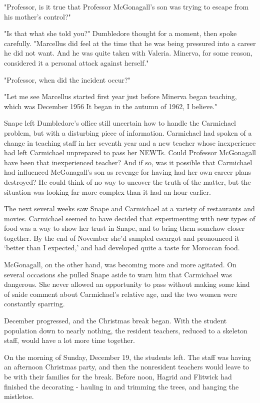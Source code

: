 "Professor, is it true that Professor McGonagall's son was trying to escape from his mother's control?"

"Is that what she told you?" Dumbledore thought for a moment, then spoke carefully. "Marcellus did feel at the time that he was being pressured into a career he did not want. And he was quite taken with Valeria. Minerva, for some reason, considered it a personal attack against herself."

"Professor, when did the{\el} incident{\el} occur?"

"Let me see{\el} Marcellus started first year just before Minerva began teaching, which was December 1956{\el} It began in the autumn of 1962, I believe."

Snape left Dumbledore's office still uncertain how to handle the Carmichael problem, but with a disturbing piece of information. Carmichael had spoken of a change in teaching staff in her seventh year and a new teacher whose inexperience had left Carmichael unprepared to pass her NEWTs. Could Professor McGonagall have been that inexperienced teacher? And if so, was it possible that Carmichael had influenced McGonagall's son as revenge for having had her own career plans destroyed? He could think of no way to uncover the truth of the matter, but the situation was looking far more complex than it had an hour earlier.

The next several weeks saw Snape and Carmichael at a variety of restaurants and movies. Carmichael seemed to have decided that experimenting with new types of food was a way to show her trust in Snape, and to bring them somehow closer together. By the end of November she'd sampled escargot and pronounced it `better than I expected,' and had developed quite a taste for Moroccan food.

McGonagall, on the other hand, was becoming more and more agitated. On several occasions she pulled Snape aside to warn him that Carmichael was dangerous. She never allowed an opportunity to pass without making some kind of snide comment about Carmichael's relative age, and the two women were constantly sparring.

December progressed, and the Christmas break began. With the student population down to nearly nothing, the resident teachers, reduced to a skeleton staff, would have a lot more time together.

On the morning of Sunday, December 19, the students left. The staff was having an afternoon Christmas party, and then the nonresident teachers would leave to be with their families for the break. Before noon, Hagrid and Flitwick had finished the decorating - hauling in and trimming the trees, and hanging the mistletoe.

